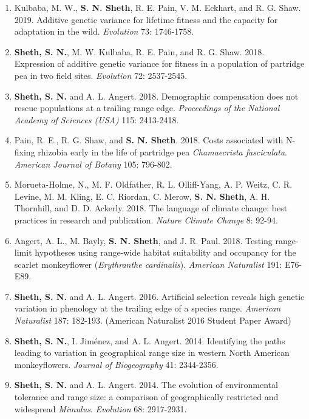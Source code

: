 \documentclass[11pt,english]{article}\usepackage[]{graphicx}\usepackage[]{color}
\begin{document}
\begin{hangparas}{.5in}{1}
\begin{enumerate}
\item Kulbaba, M. W., \textbf{S. N. Sheth}, R. E. Pain, V. M. Eckhart, and R. G. Shaw. 2019. Additive genetic variance for lifetime fitness and the capacity for adaptation in the wild. \emph{Evolution} 73: 1746-1758. 

\item \textbf{Sheth, S. N.}, M. W. Kulbaba, R. E. Pain, and R. G. Shaw. 2018. Expression of additive genetic variance for fitness in a population of partridge pea in two field sites. \emph{Evolution} 72: 2537-2545. 

\item \textbf{Sheth, S. N.} and A. L. Angert. 2018. Demographic compensation does not rescue populations at a trailing range edge. \emph{Proceedings of the National Academy of Sciences (USA)} 115: 2413-2418. 

\item Pain, R. E., R. G. Shaw, and \textbf{S. N. Sheth}. 2018. Costs associated with N-fixing rhizobia early in the life of partridge pea \textit{Chamaecrista fasciculata}. \emph{American Journal of Botany} 105: 796-802. 

\item Morueta-Holme, N., M. F. Oldfather, R. L. Olliff-Yang, A. P. Weitz, C. R. Levine, M. M. Kling, E. C. Riordan, C. Merow, \textbf{S. N. Sheth}, A. H. Thornhill, and D. D. Ackerly. 2018. The language of climate change: best practices in research and publication. \emph{Nature Climate Change} 8: 92-94.

\item Angert, A. L., M. Bayly, \textbf{S. N. Sheth}, and J. R. Paul. 2018. Testing range-limit hypotheses using range-wide habitat suitability and occupancy for the scarlet monkeyflower (\textit{Erythranthe cardinalis}). \emph{American Naturalist} 191: E76-E89.

 \item \textbf{Sheth, S. N.} and A. L. Angert. 2016. Artificial selection reveals high genetic variation in phenology at the trailing edge of a species range. \emph{American Naturalist} 187: 182-193. (American Naturalist 2016 Student Paper Award) 
 
\item \textbf{Sheth, S. N.}, I. Jim\'enez, and A. L. Angert. 2014. Identifying the paths leading to variation in geographical range size in western North American monkeyflowers. \emph{Journal of Biogeography} 41: 2344-2356. 

\item \textbf{Sheth, S. N.} and A. L. Angert. 2014. The evolution of environmental tolerance and range size: a comparison of geographically restricted and widespread \textit{Mimulus}. \emph{Evolution} 68: 2917-2931. 


\end{enumerate}
\end{hangparas}
\end{document}
